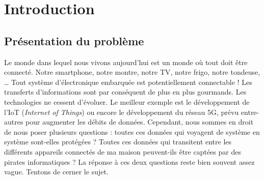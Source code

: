 \documentclass[oneside]{book}
\begin{document}
\tableofcontents
\newpage


\listoffigures
\newpage


\listoftables
\newpage
\strut
\thispagestyle{empty}
\newpage
{}



\chapter{Introduction}

\section{Présentation du problème}

Le monde dans lequel nous vivons aujourd’hui est un monde où tout doit être connecté. Notre smartphone, notre montre, notre TV, notre frigo, notre tondeuse, … Tout système d’électronique embarquée est potentiellement connectable ! Les transferts d’informations sont par conséquent de plus en plus gourmands. Les technologies ne cessent d’évoluer. Le meilleur exemple est le développement de l'IoT (\textit{Internet of Things}) ou encore le développement du réseau 5G, prévu entre-autres pour augmenter les débits de données. Cependant, nous sommes en droit de nous poser plusieurs questions : toutes ces données qui voyagent de système en système sont-elles protégées ? Toutes ces données qui transitent entre les différents appareils connectés de ma maison peuvent-ils être captées par des pirates informatiques ? La réponse à ces deux questions reste bien souvent assez vague. Tentons de cerner le sujet.
\end{document}
